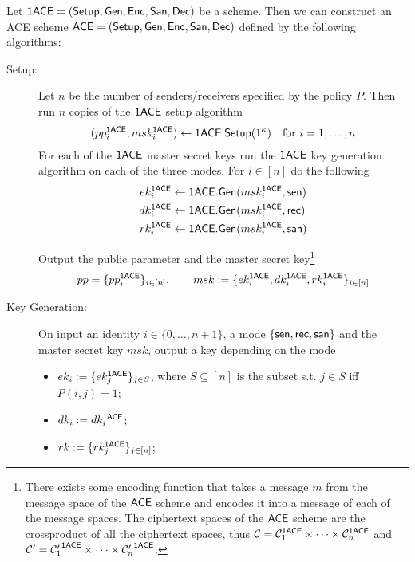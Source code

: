 \documentclass{llncs}
\begin{document}
\begin{construction} \label{con:ACE}
Let $\mathsf{1ACE} = (\mathsf{Setup}, \mathsf{Gen}, \mathsf{Enc}, \mathsf{San}, \mathsf{Dec})$ be a \oACE scheme. Then we can construct an ACE scheme $\mathsf{ACE} = (\mathsf{Setup}, \mathsf{Gen}, \mathsf{Enc}, \mathsf{San}, \mathsf{Dec})$ defined by the following algorithms:
\end{construction}
\begin{description}
\item[Setup:] Let $n$ be the number of senders/receivers specified by the policy $P$. Then run $n$ copies of the $\mathsf{1ACE}$ setup algorithm
\begin{align*}
	(pp_i^{\mathsf{1ACE}},msk_i^{\mathsf{1ACE}}) \gets \mathsf{1ACE}.\mathsf{Setup}(1^\kappa) \quad \text{for } i = 1,\dots,n
\end{align*}
For each of the $\mathsf{1ACE}$ master secret keys run the $\mathsf{1ACE}$ key generation algorithm on each of the three modes. For $i\in [n]$ do the following
\begin{align*}
	ek_i^{\mathsf{1ACE}} &\gets \mathsf{1ACE}.\mathsf{Gen}(msk_i^{\mathsf{1ACE}}, \mathsf{sen}) \\
	dk_i^{\mathsf{1ACE}} &\gets \mathsf{1ACE}.\mathsf{Gen}(msk_i^{\mathsf{1ACE}}, \mathsf{rec}) \\
	rk_i^{\mathsf{1ACE}} &\gets \mathsf{1ACE}.\mathsf{Gen}(msk_i^{\mathsf{1ACE}}, \mathsf{san}) 
\end{align*}

Output the public parameter and the master secret key\footnote{There exists some encoding function that takes a message $m$ from the message space of the $\mathsf{ACE}$ scheme and encodes it into a message of each of the \oACE message spaces. The ciphertext spaces of the $\mathsf{ACE}$ scheme are the crossproduct of all the \oACE ciphertext spaces, thus $\mathcal{C} = \mathcal{C}_1^{\mathsf{1ACE}} \times \cdots \times \mathcal{C}_n^{\mathsf{1ACE}}$ and $\mathcal{C}' = {\mathcal{C}'_1}^{\mathsf{1ACE}} \times \cdots \times {\mathcal{C}'_n}^{\mathsf{1ACE}}$.}
$$
	pp = \{ pp_i^{\mathsf{1ACE}} \}_{i \in [n]}, \qquad msk := \{ ek_i^{\mathsf{1ACE}},dk_i^{\mathsf{1ACE}}, rk_i^{\mathsf{1ACE}} \}_{i \in [n]}
$$

\item[Key Generation:] On input an identity $i\in \{0,\dots,n+1\}$, a mode $\{\mathsf{sen},\mathsf{rec},\mathsf{san}\}$ and the master secret key $msk$, output a key depending on the mode
	\begin{itemize}
	\item $ek_i := \{ek_j^{\mathsf{1ACE}} \}_{j \in S}$, where $S \subseteq [n]$ is the subset s.t. $j \in S$ iff $P(i,j) = 1$;
	
	\item $dk_i := dk_i^{\mathsf{1ACE}}$;
	
	\item $rk := \{ rk_j^{\mathsf{1ACE}} \}_{j \in [n]}$;
	\end{itemize}


\end{description}
\end{document}

